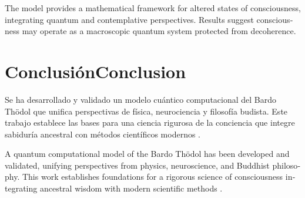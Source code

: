 \documentclass[12pt,a4paper]{article}
\newcommand{\es}[1]{\foreignlanguage{spanish}{#1}}
\newcommand{\en}[1]{\foreignlanguage{english}{#1}}
\begin{document}
\begin{otherlanguage}{english}
The model provides a mathematical framework for altered states of consciousness, integrating quantum \cite{hameroff2014} and contemplative \cite{wallace2007} perspectives. Results suggest consciousness may operate as a macroscopic quantum system protected from decoherence.
\end{otherlanguage}

\section{\es{Conclusión}\en{Conclusion}}

\begin{otherlanguage}{spanish}
Se ha desarrollado y validado un modelo cuántico computacional del Bardo Thödol que unifica perspectivas de física, neurociencia y filosofía budista. Este trabajo establece las bases para una ciencia rigurosa de la conciencia que integre sabiduría ancestral con métodos científicos modernos \cite{wallace2007}.
\end{otherlanguage}

\begin{otherlanguage}{english}
A quantum computational model of the Bardo Thödol has been developed and validated, unifying perspectives from physics, neuroscience, and Buddhist philosophy. This work establishes foundations for a rigorous science of consciousness integrating ancestral wisdom with modern scientific methods \cite{wallace2007}.
\end{otherlanguage}

\printbibliography
\end{document}
